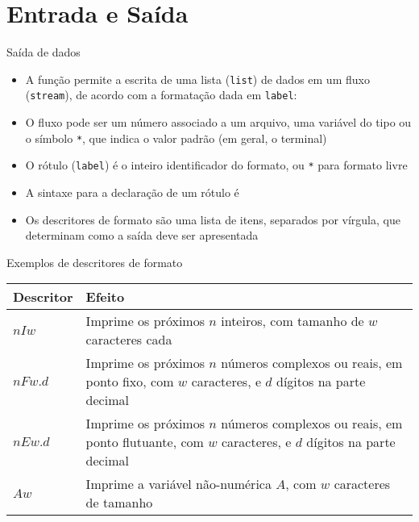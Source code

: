 \section{Entrada e Saída}

\begin{frame}[fragile]{Saída de dados}

    \begin{itemize}
        \item A função  permite a escrita de uma lista (\texttt{list})
            de dados em um fluxo (\texttt{stream}), de acordo com a formatação dada em 
            \texttt{label}:


        \item O fluxo pode ser um número associado a um arquivo, uma variável do tipo 
             ou o símbolo \texttt{*}, que indica o valor padrão (em geral,
            o terminal)

        \item O rótulo (\texttt{label}) é o inteiro identificador do formato, ou \texttt{*} para
            formato livre 

        \item A sintaxe para a declaração de um rótulo é


        \item Os descritores de formato são uma lista de itens, separados por vírgula, que 
            determinam como a saída deve ser apresentada

    \end{itemize}

\end{frame}

\begin{frame}[fragile]{Exemplos de descritores de formato}

    \begin{table}[ht]
        \centering
        \begin{tabularx}{0.95\textwidth}{lX}
            \toprule
            \textbf{Descritor} & \textbf{Efeito} \\
            \midrule
            $nIw$ & Imprime os próximos $n$ inteiros, com tamanho de $w$ caracteres cada \\
            \rowcolor[gray]{0.9}
            $nFw.d$ & Imprime os próximos $n$ números complexos ou reais, em ponto fixo,
                com $w$ caracteres, e $d$ dígitos na parte decimal \\ 
            $nEw.d$ & Imprime os próximos $n$ números complexos ou reais, em ponto flutuante,
                com $w$ caracteres, e $d$ dígitos na parte decimal \\ 
            \rowcolor[gray]{0.9}
            $Aw$ & Imprime a variável não-numérica $A$, com $w$ caracteres de tamanho \\
            \bottomrule
        \end{tabularx}
    \end{table}

\end{frame}
